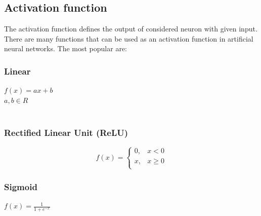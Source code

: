 \documentclass[journal, a4paper]{IEEEtran}
\begin{document}
\subsection{Activation function}
The activation function defines the output of considered neuron with given input. There are many functions that can be used as an activation function in artificial neural networks. The most popular are:
\subsubsection{Linear}
\begin{center}
$ f(x)=ax + b $ \\ $ a,b \in R $ \\~\\
\end{center}

\subsubsection{Rectified Linear Unit (ReLU)}
\[
f(x)=
\left\{
\begin{array}{ll}
      0 ,& x < 0 \\
      x ,& x\geq 0 \\
\end{array} 
\right. \]
\begin{center}
\end{center}

\subsubsection{Sigmoid}
\begin{center}
$f(x) = \frac{1}{1 + e^{-x}}$ \\
\end{center}
\end{document}
